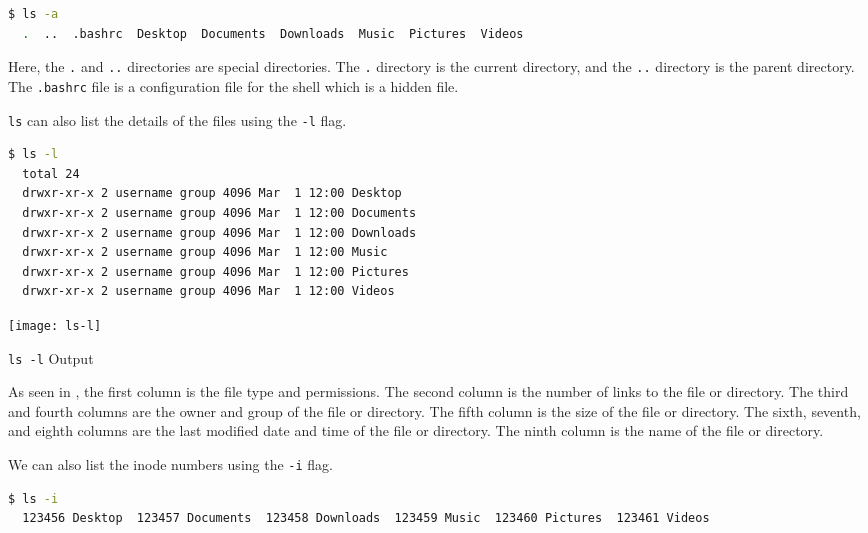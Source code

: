 \begin{lstlisting}[language=bash]
  $ ls -a
  .  ..  .bashrc  Desktop  Documents  Downloads  Music  Pictures  Videos
\end{lstlisting}

Here, the \texttt{.} and \texttt{..} directories are special directories. The \texttt{.} directory is the current directory, and the \texttt{..} directory is the parent directory.
The \texttt{.bashrc} file is a configuration file for the shell which is a hidden file.

\texttt{ls} can also list the details of the files using the \texttt{-l} flag.

\begin{lstlisting}[language=bash]
  $ ls -l
  total 24
  drwxr-xr-x 2 username group 4096 Mar  1 12:00 Desktop
  drwxr-xr-x 2 username group 4096 Mar  1 12:00 Documents
  drwxr-xr-x 2 username group 4096 Mar  1 12:00 Downloads
  drwxr-xr-x 2 username group 4096 Mar  1 12:00 Music
  drwxr-xr-x 2 username group 4096 Mar  1 12:00 Pictures
  drwxr-xr-x 2 username group 4096 Mar  1 12:00 Videos
\end{lstlisting}

\begin{marginfigure}
	\texttt{[image: ls-l]}
	\caption[\texttt{ls -l} Output]{\texttt{ls -l} Output}
\end{marginfigure}

As seen in , the first column is the file type and permissions.
The second column is the number of links to the file or directory.
The third and fourth columns are the owner and group of the file or directory.
The fifth column is the size of the file or directory.
The sixth, seventh, and eighth columns are the last modified date and time of the file or directory.
The ninth column is the name of the file or directory.

We can also list the inode numbers
using the \texttt{-i} flag.

\begin{lstlisting}[language=bash]
  $ ls -i
  123456 Desktop  123457 Documents  123458 Downloads  123459 Music  123460 Pictures  123461 Videos
\end{lstlisting}

